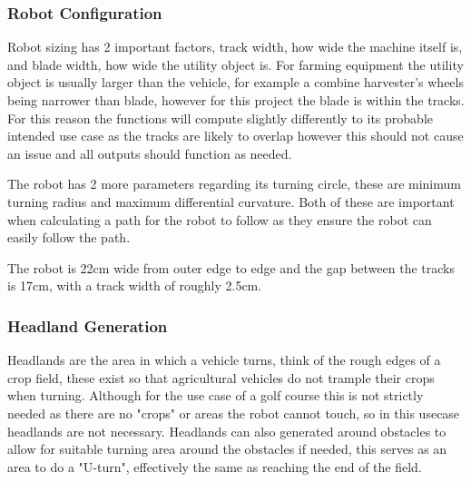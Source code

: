 \documentclass[final]{cmpreport_02}
\begin{document}
\subsubsection{Robot Configuration}
Robot sizing has 2 important factors, track width, how wide the machine itself is, and blade width, how wide the utility object is.
For farming equipment the utility object is usually larger than the vehicle, for example a combine harvester's wheels being narrower than blade, however for this project the blade is within the tracks.
For this reason the functions will compute slightly differently to its probable intended use case as the tracks are likely to overlap however this should not cause an issue and all outputs should function as needed.

The robot has 2 more parameters regarding its turning circle, these are minimum turning radius and maximum differential curvature.
Both of these are important when calculating a path for the robot to follow as they ensure the robot can easily follow the path.

The robot is 22cm wide from outer edge to edge and the gap between the tracks is 17cm, with a track width of roughly 2.5cm.


\subsubsection{Headland Generation}
Headlands are the area in which a vehicle turns, think of the rough edges of a crop field, these exist so that agricultural vehicles do not trample their crops when turning.
Although for the use case of a golf course this is not strictly needed as there are no "crops" or areas the robot cannot touch, so in this usecase headlands are not necessary.
Headlands can also generated around obstacles to allow for suitable turning area around the obstacles if needed, this serves as an area to do a "U-turn", effectively the same as reaching the end of the field.
\end{document}
